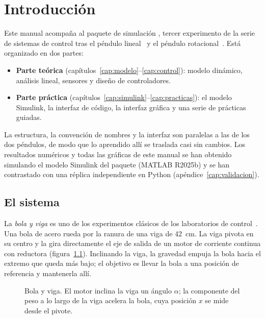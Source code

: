 \chapter{Introducción}
\label{cap:intro}

Este manual acompaña al paquete de simulación , tercer experimento de la serie de sistemas de control tras el péndulo lineal~\cite{lineal} y el péndulo rotacional~\cite{rotacional}. Está organizado en dos partes:
\begin{itemize}
  \item \textbf{Parte teórica} (capítulos~\ref{cap:modelo}--\ref{cap:control}): modelo dinámico, análisis lineal, sensores y diseño de controladores.
  \item \textbf{Parte práctica} (capítulos~\ref{cap:simulink}--\ref{cap:practicas}): el modelo Simulink, la interfaz de código, la interfaz gráfica y una serie de prácticas guiadas.
\end{itemize}
La estructura, la convención de nombres y la interfaz son paralelas a las de los dos péndulos, de modo que lo aprendido allí se traslada casi sin cambios. Los resultados numéricos y todas las gráficas de este manual se han obtenido simulando el modelo Simulink del paquete (MATLAB R2025b) y se han contrastado con una réplica independiente en Python (apéndice~\ref{cap:validacion}).

\section{El sistema}

La \emph{bola y viga} es uno de los experimentos clásicos de los laboratorios de control~\cite{hauser1992}. Una bola de acero rueda por la ranura de una viga de \SI{42}{cm}. La viga pivota en su centro y la gira directamente el eje de salida de un motor de corriente continua con reductora (figura~\ref{fig:sistema}). Inclinando la viga, la gravedad empuja la bola hacia el extremo que queda más bajo; el objetivo es llevar la bola a una posición de referencia y mantenerla allí.

\begin{figure}[H]
\centering

\caption{Bola y viga. El motor inclina la viga un ángulo $\alpha$; la componente del peso a lo largo de la viga acelera la bola, cuya posición $x$ se mide desde el pivote.}
\label{fig:sistema}
\end{figure}

